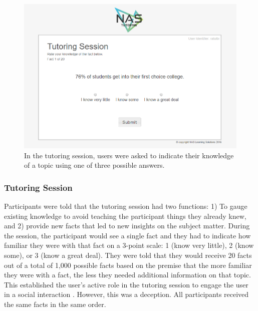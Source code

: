 \documentclass{sig-alternate-05-2015}
\begin{document}
{\begin{figure}[!h]
    \includegraphics[width=\linewidth]{figures/website/04_tutoring.png}
    \caption{In the tutoring session, users were asked to indicate their knowledge of a topic using one of three possible answers.}
\end{figure}

\subsubsection{Tutoring Session}
Participants were told that the tutoring session had two functions: 1) To gauge existing knowledge to avoid teaching the participant things they already knew, and 2) provide new facts that led to new insights on the subject matter.  During the session, the participant would see a single fact and they had to indicate how familiar they were with that fact on a 3-point scale: 1 (know very little), 2 (know some), or 3 (know a great deal). They were told that they would receive 20 facts out of a total of 1,000 possible facts based on the premise that the more familiar they were with a fact, the less they needed additional information on that topic.  This established the user's active role in the tutoring session to engage the user in a social interaction \cite{nass1993voices}.  However, this was a deception.  All participants received the same facts in the same order.

}
\end{document}

